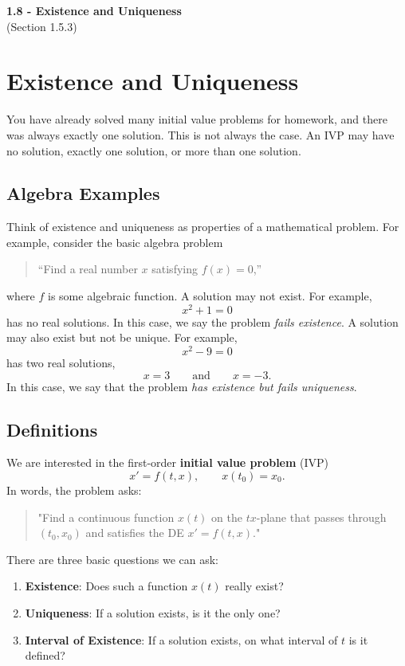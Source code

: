 \documentclass[11pt,letterpaper]{article}
\begin{document}
\begin{center}
\Large\textbf{1.8 - Existence and Uniqueness}\\
\normalsize (Section 1.5.3)
\end{center}

\section{Existence and Uniqueness}

You have already solved many initial value problems for homework, and there
was always exactly one solution. This is not always the case. An IVP may have
no solution, exactly one solution, or more than one solution.

\subsection{Algebra Examples}

Think of existence and uniqueness as properties of a mathematical problem.
For example, consider the basic algebra problem
\begin{quote}
``Find a real number $x$ satisfying $f(x)=0$,''
\end{quote}
where $f$ is some algebraic function. A solution may not exist. For example,
\[
x^2+1=0
\]
has no real solutions. In this case, we say the problem \textit{fails existence}. A solution may also exist but not be unique. For example,
\[
x^2-9=0
\]
has two real solutions,
\[
x=3
\qquad\text{and}\qquad
x=-3.
\]
In this case, we say that the problem \textit{has existence but fails uniqueness}.


\subsection{Definitions}

We are interested in the first-order \textbf{initial value problem} (IVP) 
\[
x'=f(t,x), \qquad x(t_0)=x_0.
\]
In words, the problem asks:
\begin{quote}
    "Find a continuous function $x(t)$ on the $tx$-plane that passes through $(t_0,x_0)$ and satisfies the DE $x'=f(t,x)$."
\end{quote}
There are three basic questions we can ask:
\begin{enumerate}
    \item \textbf{Existence}: Does such a function $x(t)$ really exist?
    \item \textbf{Uniqueness}: If a solution exists, is it the only one?
    \item \textbf{Interval of Existence}: If a solution exists, on what
    interval of $t$ is it defined?
\end{enumerate}
\end{document}
